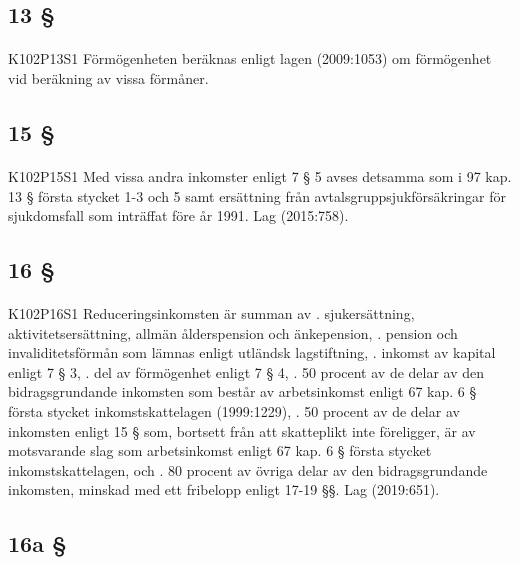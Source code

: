 \documentclass[a4paper,notitlepage,openany,10pt]{book}
\begin{document}
\subsection*{13 §}
\paragraph*{}
{\tiny K102P13S1}
Förmögenheten beräknas enligt lagen (2009:1053) om förmögenhet vid beräkning av vissa förmåner.
\subsection*{15 §}
\paragraph*{}
{\tiny K102P15S1}
Med vissa andra inkomster enligt 7 § 5 avses detsamma som i 97 kap. 13 § första stycket 1-3 och 5 samt ersättning från avtalsgruppsjukförsäkringar för sjukdomsfall som inträffat före år 1991.
Lag (2015:758).
\subsection*{16 §}
\paragraph*{}
{\tiny K102P16S1}
Reduceringsinkomsten är summan av
. sjukersättning, aktivitetsersättning, allmän ålderspension och änkepension,
. pension och invaliditetsförmån som lämnas enligt utländsk lagstiftning,
. inkomst av kapital enligt 7 § 3,
. del av förmögenhet enligt 7 § 4,
. 50 procent av de delar av den bidragsgrundande inkomsten som består av arbetsinkomst enligt 67 kap. 6 § första stycket inkomstskattelagen (1999:1229),
. 50 procent av de delar av inkomsten enligt 15 § som, bortsett från att skatteplikt inte föreligger, är av motsvarande slag som arbetsinkomst enligt 67 kap. 6 § första stycket inkomstskattelagen, och
. 80 procent av övriga delar av den bidragsgrundande inkomsten, minskad med ett fribelopp enligt 17-19 §§.
Lag (2019:651).
\subsection*{16a §}
\end{document}
